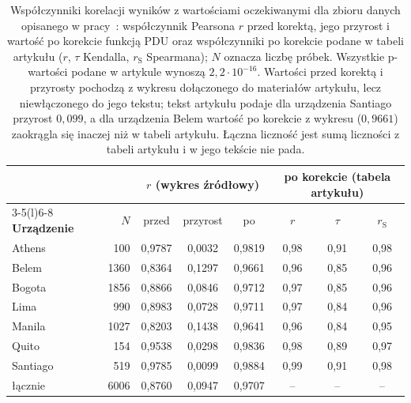 \begin{table}[htbp]
\centering
\caption[Współczynniki korelacji dla zbioru danych z artykułu ICCS 2022]{Współczynniki korelacji wyników z wartościami oczekiwanymi dla zbioru danych opisanego w pracy~\cite{werner_experiment_driven_2022}: współczynnik Pearsona $r$ przed korektą, jego przyrost i wartość po korekcie funkcją PDU oraz współczynniki po korekcie podane w tabeli artykułu ($r$, $\tau$ Kendalla, $r_{\mathrm{S}}$ Spearmana); $N$ oznacza liczbę próbek.
Wszystkie p-wartości podane w artykule wynoszą $2{,}2\cdot10^{-16}$.
Wartości przed korektą i przyrosty pochodzą z wykresu dołączonego do materiałów artykułu, lecz niewłączonego do jego tekstu; tekst artykułu podaje dla urządzenia Santiago przyrost $0{,}099$, a dla urządzenia Belem wartość po korekcie z wykresu ($0{,}9661$) zaokrągla się inaczej niż w tabeli artykułu.
Łączna liczność jest sumą liczności z tabeli artykułu i w jego tekście nie pada.}
\label{tab:pdu:app:iccs}
\footnotesize
\begin{tabular}{@{}lrcccccc@{}}
\toprule
 & & \multicolumn{3}{c}{$r$ (wykres źródłowy)} & \multicolumn{3}{c}{po korekcie (tabela artykułu)} \\
\cmidrule(lr){3-5}\cmidrule(l){6-8}
\textbf{Urządzenie} & $N$ & przed & przyrost & po & $r$ & $\tau$ & $r_{\mathrm{S}}$ \\
\midrule
Athens & 100 & 0,9787 & 0,0032 & 0,9819 & 0,98 & 0,91 & 0,98 \\
Belem & 1360 & 0,8364 & 0,1297 & 0,9661 & 0,96 & 0,85 & 0,96 \\
Bogota & 1856 & 0,8866 & 0,0846 & 0,9712 & 0,97 & 0,85 & 0,96 \\
Lima & 990 & 0,8983 & 0,0728 & 0,9711 & 0,97 & 0,84 & 0,96 \\
Manila & 1027 & 0,8203 & 0,1438 & 0,9641 & 0,96 & 0,84 & 0,95 \\
Quito & 154 & 0,9538 & 0,0298 & 0,9836 & 0,98 & 0,89 & 0,97 \\
Santiago & 519 & 0,9785 & 0,0099 & 0,9884 & 0,99 & 0,91 & 0,98 \\
łącznie & 6006 & 0,8760 & 0,0947 & 0,9707 & -- & -- & -- \\
\bottomrule
\end{tabular}
\end{table}


